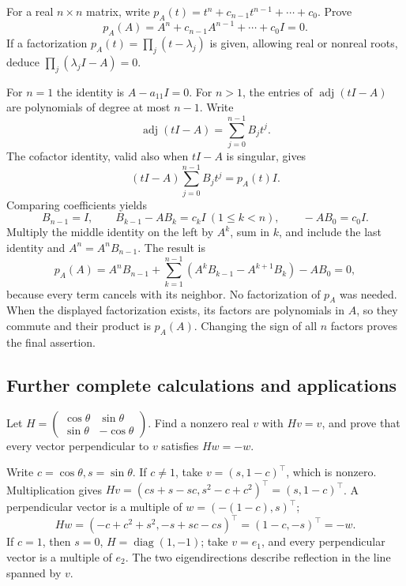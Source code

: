 \begin{problem}\label{ex:08:cayley-hamilton}
For a real \(n\times n\) matrix, write
\(p_A(t)=t^n+c_{n-1}t^{n-1}+\cdots+c_0\).
Prove
\[
 p_A(A)=A^n+c_{n-1}A^{n-1}+\cdots+c_0I=0.
\]
If a factorization \(p_A(t)=\prod_j(t-\lambda_j)\) is given, allowing
real or nonreal roots,
deduce \(\prod_j(\lambda_j I-A)=0\).
\end{problem}
\begin{solution}
For \(n=1\) the identity is \(A-a_{11}I=0\).
For \(n>1\), the entries of \(\operatorname{adj}(tI-A)\) are
polynomials of degree at most \(n-1\). Write
\[
 \operatorname{adj}(tI-A)=\sum_{j=0}^{n-1}B_jt^j.
\]
The cofactor identity, valid also when \(tI-A\) is singular, gives
\[
 (tI-A)\sum_{j=0}^{n-1}B_jt^j=p_A(t)I.
\]
Comparing coefficients yields
\[
 B_{n-1}=I,\qquad B_{k-1}-AB_k=c_kI\ (1\leqslant k<n),
 \qquad -AB_0=c_0I.
\]
Multiply the middle identity on the left by \(A^k\), sum in \(k\),
and include the last identity and \(A^n=A^nB_{n-1}\). The result is
\[
 p_A(A)=A^nB_{n-1}
 +\sum_{k=1}^{n-1}(A^kB_{k-1}-A^{k+1}B_k)-AB_0=0,
\]
because every term cancels with its neighbor.
No factorization of \(p_A\) was needed.
When the displayed factorization exists, its factors are
polynomials in \(A\), so they commute and their product is \(p_A(A)\).
Changing the sign of all \(n\) factors proves the final assertion.
\end{solution}

\subsection*{Further complete calculations and applications}
\begin{problem}[A reflection]\label{ex:08:reflection}
Let \(H=\begin{pmatrix}\cos\theta&\sin\theta\\
\sin\theta&-\cos\theta\end{pmatrix}\).
Find a nonzero real \(v\) with \(Hv=v\), and prove that every vector
perpendicular to \(v\) satisfies \(Hw=-w\).
\end{problem}
\begin{solution}
Write \(c=\cos\theta,s=\sin\theta\).
If \(c\ne1\), take \(v=(s,1-c)^\top\), which is nonzero.
Multiplication gives
\(Hv=(cs+s-sc,s^2-c+c^2)^\top=(s,1-c)^\top\).
A perpendicular vector is a multiple of \(w=(-(1-c),s)^\top\);
\[
 Hw=(-c+c^2+s^2,-s+sc-cs)^\top=(1-c,-s)^\top=-w.
\]
If \(c=1\), then \(s=0\), \(H=\operatorname{diag}(1,-1)\);
take \(v=e_1\), and every perpendicular vector is a multiple of \(e_2\).
The two eigendirections describe reflection in the line spanned by \(v\).
\end{solution}

